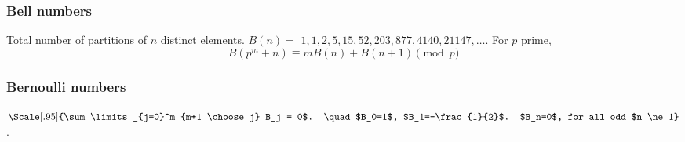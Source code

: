 {  %

  

  \subsubsection{Bell numbers}
    Total number of partitions of $n$ distinct elements. $B(n) =$
    $1, 1, 2, 5, 15, 52, 203, 877, 4140, 21147, \dots$. For $p$ prime,
    \[ B(p^m+n)\equiv mB(n)+B(n+1) \pmod{p} \]

  \subsubsection{Bernoulli numbers}
  $\Scale[.95]{\sum\limits_{j=0}^m {m+1 \choose j} B_j = 0$.
  \quad $B_0=1$, $B_1=-\frac{1}{2}$. $B_n=0$, for all odd $n \ne 1}$.

}
